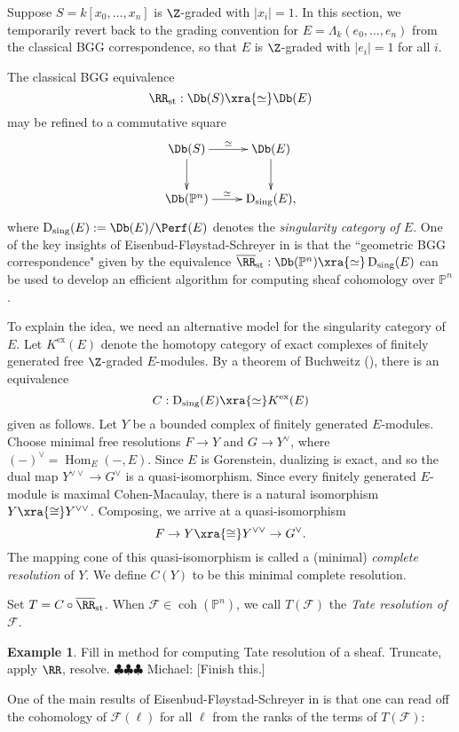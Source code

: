 \documentclass[12pt]{amsart}
\theoremstyle{definition}
\newtheorem{example}[lemma]{Example}
\theoremstyle{remark}
\newcommand{\PP}{\mathbb P}
\newcommand{\Hom}{\operatorname{Hom}} %
\newcommand{\F}{\FF}
\newcommand{\michael}[1]{{\color{red} \sf $\clubsuit\clubsuit\clubsuit$ Michael: [#1]}}
\def\on{\operatorname}
\def\F{\mathcal{F}}
\def\l{\ell}
\begin{document}
Suppose $S = k[x_0, \dots, x_n]$ is $\Z$-graded with $|x_i| = 1$. In this section, we temporarily revert back to the grading convention for $E = \Lambda_k(e_0, \dots, e_n)$ from the classical BGG correspondence, so that $E$ is $\Z$-graded with $|e_i| = 1$ for all $i$. 

The classical BGG equivalence 
$$
\RR_{\on{st}} : \Db(S) \xra{\simeq} \Db(E)
$$
may be refined to a commutative square
$$
\xymatrix{
\Db(S) \ar[r]^-{\simeq} \ar[d]& \Db(E) \ar[d] \\
\Db(\PP^n) \ar[r]^-{\simeq}& \on{D}_{\on{sing}}(E), \\
}
$$
where $\on{D}_{\on{sing}}(E) := \Db(E) / \Perf(E)$ denotes the \emph{singularity category of $E$}. One of the key insights of Eisenbud-Fl\o ystad-Schreyer in \cite{EFS} is that the ``geometric BGG correspondence" given by the equivalence $\overline{\RR}_{\on{st}}:\Db(\PP^n) \xra{\simeq} \on{D}_{\on{sing}}(E)$ can be used to develop an efficient algorithm for computing sheaf cohomology over $\PP^n$.

To explain the idea, we need an alternative model for the singularity category of $E$. Let $K^{\on{ex}}(E)$ denote the homotopy category of exact complexes of finitely generated free  $\Z$-graded $E$-modules. By a theorem of Buchweitz (\cite[Theorem 4.4.1]{buchweitz}), there is an equivalence 
$$
C: \on{D}_{\on{sing}}(E) \xra{\simeq} K^{\on{ex}}(E)
$$
given as follows. Let $Y$ be a bounded complex of finitely generated $E$-modules. Choose minimal free resolutions $F \to Y$ and $G \to Y^\vee$, where $( - )^{\vee} = \Hom_E( - , E)$. Since $E$ is Gorenstein, dualizing is exact, and so the dual map $Y^{\vee \vee} \to G^\vee$ is a quasi-isomorphism. Since every finitely generated $E$-module is maximal Cohen-Macaulay, there is a natural isomorphism $Y \xra{\cong} Y^{\vee \vee}$. Composing, we arrive at a quasi-isomorphism
$$
F \to Y \xra{\cong} Y^{\vee \vee} \to G^{\vee}. 
$$
The mapping cone of this quasi-isomorphism is called a (minimal) \emph{complete resolution} of $Y$. We define $C(Y)$ to be this minimal complete resolution.

Set $T = C \circ \overline{\RR}_{\on{st}}$. When $\F \in \on{coh}(\PP^n)$, we call $T(\F)$ the \emph{Tate resolution of $\F$}. 

\begin{example}
Fill in method for computing Tate resolution of a sheaf. Truncate, apply $\RR$, resolve. \michael{Finish this.}
\end{example}


One of the main results of Eisenbud-Fl\o ystad-Schreyer in \cite{EFS} is that one can read off the cohomology of $\F(\l)$ for all $\l$ from the ranks of the terms of $T(\F)$:
\end{document}
